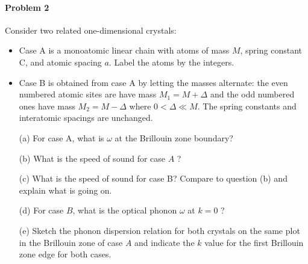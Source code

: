 \documentclass[hyperref, a4paper]{article}
\begin{document}
\paragraph{Problem 2} Consider two related one-dimensional crystals:
\begin{itemize}
\item Case $\mathrm{A}$ is a monoatomic linear chain with atoms of mass $M$, spring constant $\mathrm{C}$, and atomic spacing $a$. Label the atoms by the integers.
\item Case B is obtained from case A by letting the masses alternate: the even numbered atomic sites are have mass $M_1=M+\Delta$ and the odd numbered ones have mass $M_2=M-\Delta$ where $0<\Delta \ll M$. The spring constants and interatomic spacings are unchanged.
\end{itemize}
\begin{itemize}
\item[(a)] For case A, what is $\omega$ at the Brillouin zone boundary?
\item[(b)] What is the speed of sound for case $A$ ?
\item[(c)] What is the speed of sound for case B? Compare to question (b) and explain what is going on.
\item[(d)] For case $B$, what is the optical phonon $\omega$ at $k=0$ ?
\item[(e)] Sketch the phonon dispersion relation for both crystals on the same plot in the Brillouin zone of case $A$ and indicate the $k$ value for the first Brillouin zone edge for both cases.
\end{itemize}
\end{document}
